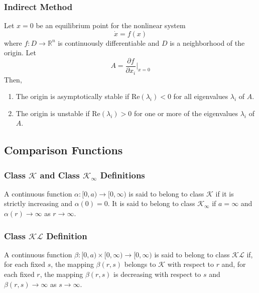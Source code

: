 \documentclass{article}
\begin{document}
\subsubsection{Indirect Method}
Let \(x = 0\) be an equilibrium point for the nonlinear system
\[
	\dot{x} = f(x)
\]
where \(f : D \to \mathbb{R}^n\) is continuously differentiable and \(D\) is a
neighborhood of the origin. Let
\[
	A = \frac{\partial f}{\partial x_i}\bigg|_{x=0}
\]
Then,
\begin{enumerate}
	\item The origin is asymptotically stable if \(\text{Re}(\lambda_i) < 0\) for all
	      eigenvalues \(\lambda_i\) of \(A\).
	\item The origin is unstable if \(\text{Re}(\lambda_i) > 0\) for one or more of the
	      eigenvalues \(\lambda_i\) of \(A\).
\end{enumerate}
\subsection{Comparison Functions}
\subsubsection{Class $\mathcal{K}$ and Class $\mathcal{K}_{\infty}$ Definitions}
A continuous function \(\alpha : [0, a) \to [0, \infty)\) is said to belong to class \(\mathcal{K}\) if it is strictly increasing and \(\alpha(0) = 0\). It is said to belong to class \(\mathcal{K}_\infty\) if \(a = \infty\) and \(\alpha(r) \to \infty\) as \(r \to \infty\).
\subsubsection{Class $\mathcal{K}\mathcal{L}$ Definition}
A continuous function \(\beta : [0, a) \times [0, \infty) \to [0, \infty)\) is said to belong to class \(\mathcal{K}\mathcal{L}\) if, for each fixed $s$, the mapping $\beta(r,s)$ belongs to $\mathcal{K}$ with respect to $r$ and, for each fixed $r$, the mapping $\beta(r,s)$ is decreasing with respect to $s$ and \(\beta(r,s) \to \infty\) as \(s \to \infty\).
\end{document}
